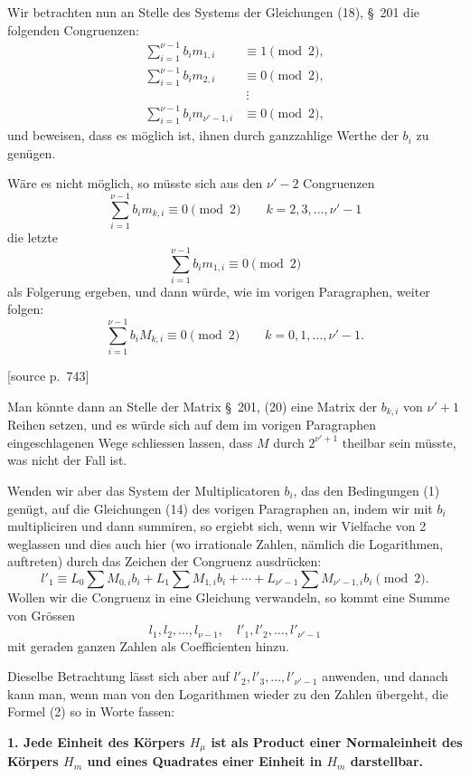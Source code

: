 \documentclass[11pt]{article}
\newcommand{\srcpage}[1]{\par\medskip\noindent\textsf{[source p.~#1]}\par\smallskip}
\begin{document}
Wir betrachten nun an Stelle des Systems der Gleichungen (18), \S~201 die folgenden Congruenzen:
\begin{equation}
\begin{aligned}
\sum_{i=1}^{\nu-1}b_i m_{1,i}&\equiv1\pmod2,\\
\sum_{i=1}^{\nu-1}b_i m_{2,i}&\equiv0\pmod2,\\
&\ \vdots\\
\sum_{i=1}^{\nu-1}b_i m_{\nu'-1,i}&\equiv0\pmod2,
\end{aligned}
\tag{1}
\end{equation}
und beweisen, dass es möglich ist, ihnen durch ganzzahlige Werthe der $b_i$ zu genügen.

Wäre es nicht möglich, so müsste sich aus den $\nu'-2$ Congruenzen
\[
\sum_{i=1}^{\nu-1}b_i m_{k,i}\equiv0\pmod2\qquad k=2,3,\ldots,\nu'-1
\]
die letzte
\[
\sum_{i=1}^{\nu-1}b_i m_{1,i}\equiv0\pmod2
\]
als Folgerung ergeben, und dann würde, wie im vorigen Paragraphen, weiter folgen:
\[
\sum_{i=1}^{\nu-1}b_i M_{k,i}\equiv0\pmod2\qquad k=0,1,\ldots,\nu'-1.
\]

\srcpage{743}
Man könnte dann an Stelle der Matrix \S~201, (20) eine Matrix der $b_{k,i}$ von $\nu'+1$ Reihen setzen, und es würde sich auf dem im vorigen Paragraphen eingeschlagenen Wege schliessen lassen, dass $M$ durch $2^{\nu'+1}$ theilbar sein müsste, was nicht der Fall ist.

Wenden wir aber das System der Multiplicatoren $b_i$, das den Bedingungen (1) genügt, auf die Gleichungen (14) des vorigen Paragraphen an, indem wir mit $b_i$ multipliciren und dann summiren, so ergiebt sich, wenn wir Vielfache von 2 weglassen und dies auch hier (wo irrationale Zahlen, nämlich die Logarithmen, auftreten) durch das Zeichen der Congruenz ausdrücken:
\begin{equation}
l'_1\equiv L_0\sum M_{0,i}b_i+L_1\sum M_{1,i}b_i+\cdots+L_{\nu'-1}\sum M_{\nu'-1,i}b_i\pmod2.
\tag{2}
\end{equation}
Wollen wir die Congruenz in eine Gleichung verwandeln, so kommt eine Summe von Grössen
\[
l_1,l_2,\ldots,l_{\nu-1},\quad l'_1,l'_2,\ldots,l'_{\nu'-1}
\]
mit geraden ganzen Zahlen als Coefficienten hinzu.

Dieselbe Betrachtung lässt sich aber auf $l'_2,l'_3,\ldots,l'_{\nu'-1}$ anwenden, und danach kann man, wenn man von den Logarithmen wieder zu den Zahlen übergeht, die Formel (2) so in Worte fassen:

\begin{center}\textbf{1. Jede Einheit des Körpers $H_\mu$ ist als Product einer Normaleinheit des Körpers $H_m$ und eines Quadrates einer Einheit in $H_m$ darstellbar.}\end{center}
\end{document}

